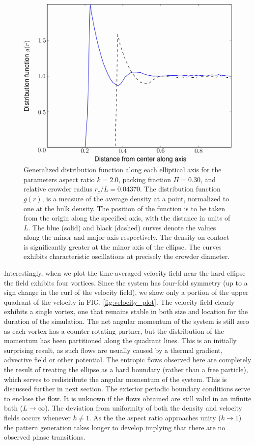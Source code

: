 \begin{figure}
\includegraphics[width=\figurewidthSINGLE]{tex/entropic_flow_paper/FIG2_EDIT.jpg}
\caption{Generalized distribution function along each elliptical axis for the parameters aspect ratio $k=2.0$, packing fraction $\Pi=0.30$, and relative crowder radius $r_c/L=0.04370$. The distribution function $g(r)$, is a measure of the average density at a point, normalized to one at the bulk density. The position of the function is to be taken from the origin along the specified axis, with the distance in units of $L$. The blue (solid) and black (dashed) curves denote the values along the minor and major axis respectively. The density on-contact is significantly greater at the minor axis of the ellipse. The curves exhibits characteristic oscillations at precisely the crowder diameter. }
\label{fig:radial_plot}
\end{figure}

Interestingly, when we plot the time-averaged velocity field near the hard ellipse the field exhibits four vortices. Since the system has four-fold symmetry (up to a sign change in the curl of the velocity field), we show only a portion of the upper quadrant of the velocity in FIG. \ref{fig:velocity_plot}. The velocity field clearly exhibits a single vortex, one that remains stable in both size and location for the duration of the simulation. The net angular momentum of the system is still zero as each vortex has a counter-rotating partner, but the distribution of the momentum has been partitioned along the quadrant lines. This is an initially surprising result, as such flows are usually caused by a thermal gradient, advective field or other potential. The entropic flows observed here are completely the result of treating the ellipse as a hard boundary (rather than a free particle), which serves to redistribute the angular momentum of the system. This is discussed further in next section. The exterior periodic boundary conditions serve to enclose the flow. It is unknown if the flows obtained are still valid in an infinite bath ($L \rightarrow \infty$). The deviation from uniformity of both the density and velocity fields occurs whenever $k \neq 1$. As the the aspect ratio approaches unity ($k \rightarrow 1$) the pattern generation takes longer to develop implying that there are no observed phase transitions.

